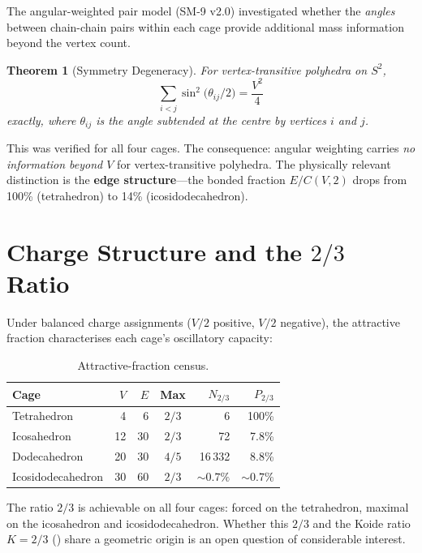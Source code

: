 \documentclass[11pt,letterpaper]{article}
\newtheorem{theorem}{Theorem}[section]
\begin{document}
The angular-weighted pair model (SM-9 v2.0) investigated whether
the \emph{angles} between chain-chain pairs within each cage
provide additional mass information beyond the vertex count.

\begin{theorem}[Symmetry Degeneracy]
\label{thm:degeneracy}
For vertex-transitive polyhedra on $S^2$,
\[
  \sum_{i<j} \sin^2\!\bigl(\theta_{ij}/2\bigr)
  = \frac{V^2}{4}
\]
exactly, where $\theta_{ij}$ is the angle subtended at the centre
by vertices $i$ and $j$.
\end{theorem}

This was verified for all four cages.  The consequence: angular
weighting carries \emph{no information beyond $V$} for
vertex-transitive polyhedra.  The physically relevant distinction
is the \textbf{edge structure}---the bonded fraction $E/C(V,2)$
drops from 100\% (tetrahedron) to 14\% (icosidodecahedron).

\section{Charge Structure and the $2/3$ Ratio}
\label{sec:charge}

Under balanced charge assignments ($V/2$ positive, $V/2$ negative),
the attractive fraction characterises each cage's oscillatory
capacity:

\begin{table}[H]
\centering
\caption{Attractive-fraction census.}
\label{tab:charge}
\begin{tabular}{@{}lrrcrr@{}}
\toprule
Cage & $V$ & $E$ & Max & $N_{2/3}$ & $P_{2/3}$ \\
\midrule
Tetrahedron       &  4 &  6 & $2/3$ &       6 & 100\% \\
Icosahedron       & 12 & 30 & $2/3$ &      72 &  7.8\% \\
Dodecahedron      & 20 & 30 & $4/5$ & 16\,332 &  8.8\% \\
Icosidodecahedron & 30 & 60 & $2/3$ & $\sim 0.7\%$ & $\sim 0.7\%$ \\
\bottomrule
\end{tabular}
\end{table}

The ratio $2/3$ is achievable on all four cages: forced on the
tetrahedron, maximal on the icosahedron and icosidodecahedron.
Whether this $2/3$ and the Koide ratio $K = 2/3$
(\citealp{abshier2026sm3}) share a geometric origin is an open
question of considerable interest.
\end{document}
